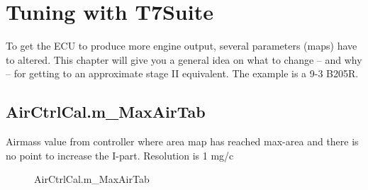 \documentclass[11pt,a4paper]{book}
\newcommand{\Mfig}[1]{%
\begin{figure}[<+htpb+>]
    \centering
    \missingfigure{}
    \caption{#1}
\end{figure}}
\begin{document}
\section{Tuning with T7Suite}
To get the ECU to produce more engine output, several parameters (maps) have to altered. This
chapter will give you a general idea on what to change – and why – for getting to an approximate
stage II equivalent. The example is a 9-3 B205R.

\subsection{AirCtrlCal.m\_MaxAirTab}
Airmass value from controller where area map has reached max-area and there is no point to increase
the I-part. Resolution is 1 mg/c
\Mfig{AirCtrlCal.m\_MaxAirTab}
\end{document}
